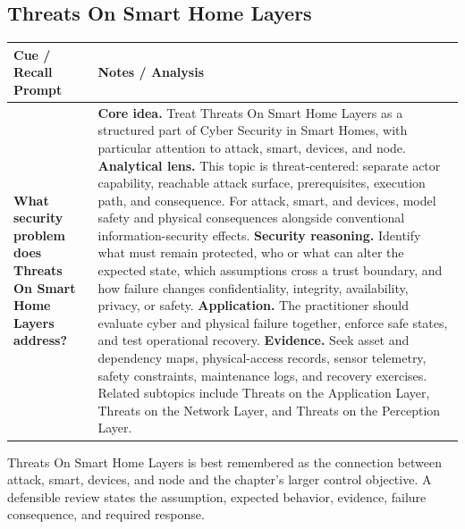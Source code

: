 \documentclass[11pt]{article}
\newcommand{\CornellHeader}{%
\rowcolor{Navy}\color{white}\bfseries Cue / Recall Prompt & \color{white}\bfseries Notes / Analysis\\\hline}
\newcommand{\CornellRow}[2]{%
\cellcolor{CueGray}\RaggedRight\textbf{#1} & \RaggedRight #2\\\hline}
\begin{document}
\subsection*{Threats On Smart Home Layers}
\begin{longtable}{>{\RaggedRight\arraybackslash}p{}|>{\RaggedRight\arraybackslash}p{}}
\CornellHeader
\CornellRow{What security problem does Threats On Smart Home Layers address?}{\textbf{Core idea.} Treat Threats On Smart Home Layers as a structured part of Cyber Security in Smart Homes, with particular attention to attack, smart, devices, and node. \textbf{Analytical lens.} This topic is threat-centered: separate actor capability, reachable attack surface, prerequisites, execution path, and consequence. For attack, smart, and devices, model safety and physical consequences alongside conventional information-security effects. \textbf{Security reasoning.} Identify what must remain protected, who or what can alter the expected state, which assumptions cross a trust boundary, and how failure changes confidentiality, integrity, availability, privacy, or safety. \textbf{Application.} The practitioner should evaluate cyber and physical failure together, enforce safe states, and test operational recovery. \textbf{Evidence.} Seek asset and dependency maps, physical-access records, sensor telemetry, safety constraints, maintenance logs, and recovery exercises. Related subtopics include Threats on the Application Layer, Threats on the Network Layer, and Threats on the Perception Layer.}
\end{longtable}
\begin{topicsummary}
Threats On Smart Home Layers is best remembered as the connection between attack, smart, devices, and node and the chapter's larger control objective. A defensible review states the assumption, expected behavior, evidence, failure consequence, and required response.
\end{topicsummary}
\end{document}

